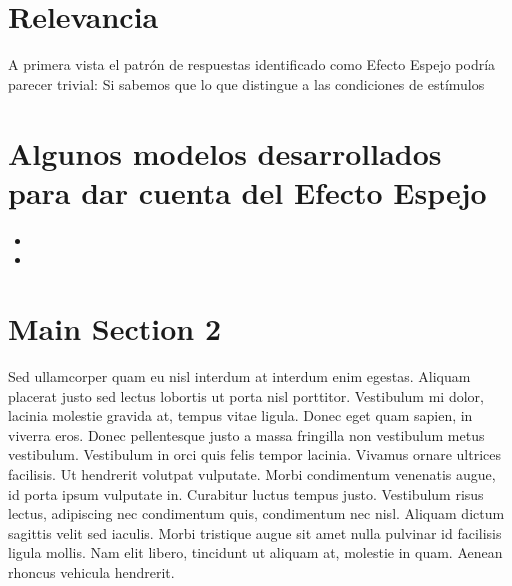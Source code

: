 \section{Relevancia}
A primera vista el patrón de respuestas identificado como Efecto Espejo podría parecer trivial: Si sabemos que lo que distingue a las condiciones de estímulos 

\section{Algunos modelos desarrollados para dar cuenta del Efecto Espejo}

\begin{itemize} 
\item
\item
\end{itemize}





\section{Main Section 2}

Sed ullamcorper quam eu nisl interdum at interdum enim egestas. Aliquam placerat justo sed lectus lobortis ut porta nisl porttitor. Vestibulum mi dolor, lacinia molestie gravida at, tempus vitae ligula. Donec eget quam sapien, in viverra eros. Donec pellentesque justo a massa fringilla non vestibulum metus vestibulum. Vestibulum in orci quis felis tempor lacinia. Vivamus ornare ultrices facilisis. Ut hendrerit volutpat vulputate. Morbi condimentum venenatis augue, id porta ipsum vulputate in. Curabitur luctus tempus justo. Vestibulum risus lectus, adipiscing nec condimentum quis, condimentum nec nisl. Aliquam dictum sagittis velit sed iaculis. Morbi tristique augue sit amet nulla pulvinar id facilisis ligula mollis. Nam elit libero, tincidunt ut aliquam at, molestie in quam. Aenean rhoncus vehicula hendrerit.